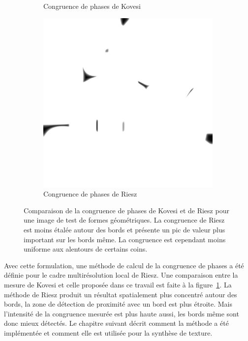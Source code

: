 \begin{figure}
\begin{subfigure}{.3\textwidth}
        \caption{Congruence de phases de Kovesi}
    \end{subfigure}
    \hfill
    \begin{subfigure}{.3\textwidth}
        \centering
        \includegraphics[width=\textwidth]{contenu/resources/images/geometric_shapes_pc_riesz}
        \caption{Congruence de phases de Riesz}
    \end{subfigure}

    \caption[Comparaison de la congruence de phases de Kovesi et de Riesz]{Comparaison de la congruence de phases de Kovesi et de Riesz pour une image de test de formes géométriques. La congruence de Riesz est moins étalée autour des bords et présente un pic de valeur plus important sur les bords même. La congruence est cependant moins uniforme aux alentours de certains coins.}
    \label{fig:phase-congruency-riesz}
\end{figure}

\bigskip

Avec cette formulation, une méthode de calcul de la congruence de phases a été définie pour le cadre multirésolution local de Riesz. Une comparaison entre la mesure de Kovesi et celle proposée dans ce travail est faite à la figure~\ref{fig:phase-congruency-riesz}. La méthode de Riesz produit un résultat spatialement plus concentré autour des bords, la zone de détection de proximité avec un bord est plus étroite. Mais l'intensité de la congruence mesurée est plus haute aussi, les bords même sont donc mieux détectés. Le chapitre suivant décrit comment la méthode a été implémentée et comment elle est utilisée pour la synthèse de texture.

